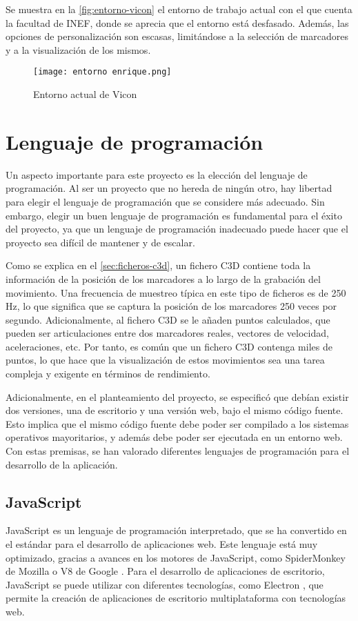 Se muestra en la \autoref{fig:entorno-vicon} el entorno de trabajo actual con el que cuenta la facultad de \ac{INEF}, donde se aprecia que el entorno está desfasado. Además, las opciones de personalización son escasas, limitándose a la selección de marcadores y a la visualización de los mismos.

\begin{figure}[H]
    \centering
    \texttt{[image: entorno enrique.png]}
    \caption{Entorno actual de Vicon}
    \label{fig:entorno-vicon}
\end{figure}

\section{Lenguaje de programación}

Un aspecto importante para este proyecto es la elección del lenguaje de programación. Al ser un proyecto que no hereda de ningún otro, hay libertad para elegir el lenguaje de programación que se considere más adecuado. Sin embargo, elegir un buen lenguaje de programación es fundamental para el éxito del proyecto, ya que un lenguaje de programación inadecuado puede hacer que el proyecto sea difícil de mantener y de escalar.

Como se explica en el \autoref{sec:ficheros-c3d}, un fichero \ac{C3D} contiene toda la información de la posición de los marcadores a lo largo de la grabación del movimiento. Una frecuencia de muestreo típica en este tipo de ficheros es de 250 \ac{Hz}, lo que significa que se captura la posición de los marcadores 250 veces por segundo. Adicionalmente, al fichero \ac{C3D} se le añaden puntos calculados, que pueden ser articulaciones entre dos marcadores reales, vectores de velocidad, aceleraciones, etc. Por tanto, es común que un fichero \ac{C3D} contenga miles de puntos, lo que hace que la visualización de estos movimientos sea una tarea compleja y exigente en términos de rendimiento.

Adicionalmente, en el planteamiento del proyecto, se especificó que debían existir dos versiones, una de escritorio y una versión web, bajo el mismo código fuente. Esto implica que el mismo código fuente debe poder ser compilado a los sistemas operativos mayoritarios, y además debe poder ser ejecutada en un entorno web. Con estas premisas, se han valorado diferentes lenguajes de programación para el desarrollo de la aplicación.  

\subsection{JavaScript}
JavaScript es un lenguaje de programación interpretado, que se ha convertido en el estándar para el desarrollo de aplicaciones web. Este lenguaje está muy optimizado, gracias a avances en los motores de JavaScript, como SpiderMonkey de Mozilla o V8 de Google \autocite{srinetChromeV8Firefox2022}. Para el desarrollo de aplicaciones de escritorio, JavaScript se puede utilizar con diferentes tecnologías, como Electron \autocite{BuildCrossplatformDesktop}, que permite la creación de aplicaciones de escritorio multiplataforma con tecnologías web. 

